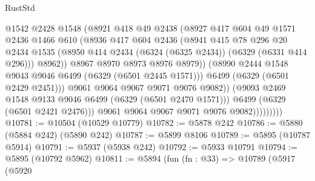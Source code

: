 \begin{lexlean}{RustStd}
\begin{coremodule}
{\begin{coremodule}
{{{{{{{{{{{{{{{{{{{{{{{{{{{{{{{{{{{                              @1542
                              @2428
                              @1548
                              (@8921
                                @418
                                @49
                                @2438
                                (@8927
                                  @417
                                  @604
                                  @49
                                  @1571
                                  @2436
                                  @1466
                                  @610
                                  (@8936
                                    @417
                                    @604
                                    @2436
                                    (@8941
                                      @415
                                      @78
                                      @296
                                      @20
                                      @2434
                                      @1535
                                      (@8950
                                        @414
                                        @2434
                                        (@6324 (@6325 @2434))
                                        (@6329 (@6331 @414 @296)))
                                      @8962))
                                  @8967
                                  @8970
                                  @8973
                                  @8976
                                  @8979))
                              (@8990 @2444 @1548 @9043 @9046 @6499 (@6329 (@6501 @2445 @1571)))
                              @6499
                              (@6329 (@6501 @2429 @2451)))
                            @9061
                            @9064
                            @9067
                            @9071
                            @9076
                            @9082))
                        (@9093 @2469 @1548 @9133 @9046 @6499 (@6329 (@6501 @2470 @1571)))
                        @6499
                        (@6329 (@6501 @2421 @2476)))
                      @9061
                      @9064
                      @9067
                      @9071
                      @9076
                      @9082)))))))))
@10781 := @10504 (@10529 @10779)
@10782 := @5878 @242
@10786 := @5880 (@5884 @242) (@5890 @242)
@10787 := @5899 @8106
@10789 := @5895 (@10787 @5914)
@10791 := @5937 (@5938 @242)
@10792 := @5933 @10791
@10794 := @5895 (@10792 @5962)
@10811 := @5894
    (fun (fn : @33) =>
    @10789
      (@5917
        (@5920
}}}}}}}}}}}}}}}}}}}}}}}}}}}}}}}}}}}
\end{coremodule}}
\end{coremodule}
\end{lexlean}
